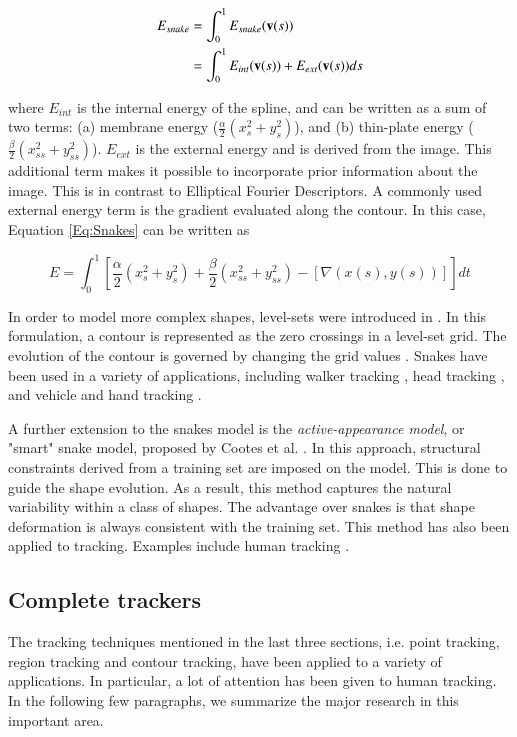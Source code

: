 \begin{align}
E_{snake} &= \int_0^1 E_{snake}(\mathbf{v}(s)) \notag\\
&=\int_0^1 E_{int}(\mathbf{v}(s)) + E_{ext}(\mathbf{v}(s)) ds
\label{Eq:Snakes}
\end{align}

where $E_{int}$ is the internal energy of the spline, and can be written as a sum of two terms: (a) membrane energy ($\frac{\alpha}{2}(x_s^2 + y_s^2)$), and (b) thin-plate energy ($\frac{\beta}{2}(x_{ss}^2 + y_{ss}^2)$).  $E_{ext}$ is the external energy and is derived from the image.  This additional term makes it possible to incorporate prior information about the image.  This is in contrast to Elliptical Fourier Descriptors.  A commonly used external energy term is the gradient evaluated along the contour.  In this case, Equation \ref{Eq:Snakes} can be written as

\begin{equation}
	\label{eq:SnakesEnergy1}
	E=\int_0^1 \left[\frac{\alpha}{2}(x_s^2 + y_s^2) + \frac{\beta}{2}(x_{ss}^2 + y_{ss}^2) - \left[\nabla{(x(s), y(s))}\right]\right]dt
\end{equation}

In order to model more complex shapes, level-sets were introduced in \cite{1995_JNL_LevelSets_Malladi}.  In this formulation, a contour is represented as the zero crossings in a level-set grid.  The evolution of the contour is governed by changing the grid values \cite{2006_JNL_SURVEYtrk_Yilmaz}.  Snakes have been used in a variety of applications, including walker tracking \cite{1994_CNF_WalkingFiguresXYT_Niyogi}, head tracking \cite{2001_JNL_ProbabilisticDataAssociation_Rasmussen}, and vehicle and hand tracking \cite{1999_JNL_KalmanSnakes_Peterfreund}.

A further extension to the snakes model is the \emph{active-appearance model}, or "smart" snake model, proposed by Cootes et al. \cite{1995_JNL_ActiveModels_Cootes}.  In this approach, structural constraints derived from a training set are imposed on the model.  This is done to guide the shape evolution.  As a result, this method captures the natural variability within a class of shapes.  The advantage over snakes is that shape deformation is always consistent with the training set.  This method has also been applied to tracking.  Examples include human tracking \cite{1994_CNF_ContourTracking_BaumbergHogg, 2003_JNL_ActiveShapeTracking_Koschan}.


\subsection{Complete trackers}
The tracking techniques mentioned in the last three sections, i.e. point tracking, region tracking and contour tracking, have been applied to a variety of applications.  In particular, a lot of attention has been given to human tracking.  In the following few paragraphs, we summarize the major research in this important area.


